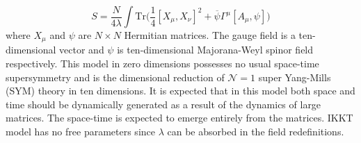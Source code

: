 \documentclass[11pt]{article}
\begin{document}
\begin{equation}
	\label{eq:IKKT} 
S = \frac{N}{4\lambda} \int \mbox{Tr} \Big( \frac{1}{4} [X_\mu, X_\nu]^{2} + \overline{\psi} \Gamma^{\mu} [A_{\mu},\psi] \Big) 
\end{equation}
where $X_{\mu}$ and $\psi$ are $N \times N$ Hermitian matrices. The gauge field is a ten-dimensional vector and $\psi$ is ten-dimensional Majorana-Weyl spinor field respectively. This model in zero dimensions possesses no usual space-time supersymmetry and is the dimensional reduction of $\mathcal{N}=1$ super Yang-Mills (SYM) theory in ten dimensions. It is expected that in this model both space and time should be dynamically generated as a result of the dynamics of  large matrices. 
The space-time is expected to emerge entirely from the matrices. 
IKKT model has no free parameters since $\lambda$ can be absorbed in the 
field redefinitions. 
\end{document}
